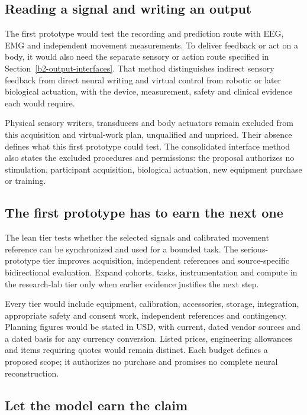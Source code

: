 \subsection{Reading a signal and writing an output}

The first prototype would test the recording and prediction route with EEG,
EMG and independent movement measurements. To deliver feedback or act on a
body, it would also need the separate sensory or action route specified in
Section~\ref{b2-output-interfaces}. That method distinguishes indirect sensory
feedback from direct neural writing and virtual control from robotic or later
biological actuation, with the device, measurement, safety and clinical evidence
each would require.

Physical sensory writers, transducers and body actuators remain excluded from
this acquisition and virtual-work plan, unqualified and unpriced. Their absence
defines what this first prototype could test. The consolidated interface method
also states the excluded procedures and permissions: the proposal authorizes
no stimulation, participant acquisition, biological actuation, new equipment
purchase or training.

\subsection{The first prototype has to earn the next one}

The lean tier tests whether the selected signals and calibrated movement
reference can be synchronized and used for a bounded task. The serious-prototype tier
improves acquisition, independent references and source-specific bidirectional
evaluation. Expand cohorts, tasks, instrumentation and compute in the research-lab
tier only when earlier evidence justifies the next step.

Every tier would include equipment, calibration, accessories, storage,
integration, appropriate safety and consent work, independent references and
contingency. Planning figures would be stated in USD, with current, dated vendor sources
and a dated basis for any currency conversion. Listed prices, engineering
allowances and items requiring quotes would remain distinct. Each budget
defines a proposed scope; it authorizes no purchase and promises no complete
neural reconstruction.

\subsection{Let the model earn the claim}

